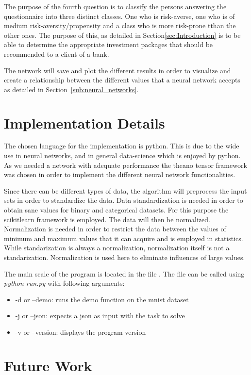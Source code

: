\documentclass{article}
\begin{document}
The purpose of the fourth question is to classify the persons answering the questionnaire into three distinct classes. One who is risk-averse, one who is of medium risk-aversity/propensity and a class who is more risk-prone tthan the other ones. The purpose of this, as detailed in Section\ref{sec:Introduction} is to be able to determine the appropriate investment packages that should be recommended to a client of a bank.

The network will save and plot the different results in order to visualize and create a relationship between the different values that a neural network accepts as detailed in Section~\ref{sub:neural_networks}.

\section{Implementation Details}
\label{sec:implementation_details}

The chosen language for the implementation is python. This is due to the wide use in neural networks, and in general data-science which is enjoyed by python. As we needed a network with adequate performance the theano tensor framework was chosen in order to implement the different neural network functionalities.

Since there can be different types of data, the algorithm will preprocess the input sets in order to standardize the data. Data standardization is needed in order to obtain sane values for binary and categorical datasets. For this purpose the scikitlearn framework is employed. The data will then be normalized. Normalization is needed in order to restrict the data between the values of minimum and maximum values that it can acquire and is employed in statistics. While standarization is always a normalization, normalization itself is not a standarization. Normalization is used here to eliminate influences of large values.

The main scale of the program is located in the file . The file can be called using \textit{python run.py} with following arguments:
\begin{itemize}
    \item -d or --demo: runs the demo function on the mnist dataset
    \item -j or --json: expects a json as input with the task to solve
    \item -v or --version: displays the program version
\end{itemize}

\section{Future Work}
\label{sec:future_work}
\end{document}
